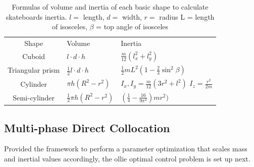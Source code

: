 \documentclass[default,iicol]{sn-jnl}
\theoremstyle{thmstyleone}%
\theoremstyle{thmstyletwo}%
\theoremstyle{thmstylethree}%
\begin{document}
\begin{table}
\begin{center}
\caption[Inertia]{Formulas of volume and inertia of each basic shape to calculate skateboards inertia. $l=$ length, $d=$ width, $r=$ radius L = length of isosceles, $\beta$ = top angle of isosceles}
\label{t_volume_inert}
\begin{tabular}{c l p{1.06in}}
& & \\ %
\hline
Shape & Volume & Inertia \\
\hline
Cuboid           & $l\cdot d\cdot h$              & $\frac{m}{12} (l_x^2+l_y^2)$ \\
Triangular prism & $\frac{1}{2} l\cdot d\cdot h$  &  $\frac{1}{2} m L^2\left(1-\frac{2}{3} \sin ^2 \beta\right)$ \cite{morin_introduction_2008}\\
Cylinder         & $\pi h (R^2-r^2)$                        &  $I_{x},I_{y} = \frac{m}{12} (3 r^2 + l^2)$ $I_{z} = \frac{r^2}{2 m} $ \\
Semi-cylinder    & $\frac{1}{2}\pi h (R^2-r^2)$             &  $(\frac{1}{4}-\frac{16}{9 \pi^2}) m r^2)$ \\
\hline
\end{tabular}

\end{center}
\end{table}

\subsection{Multi-phase Direct Collocation}\label{s_multiphase}
Provided the framework to perform a parameter optimization that scales mass and inertial values accordingly, the ollie optimal control problem is set up next. 
\end{document}
